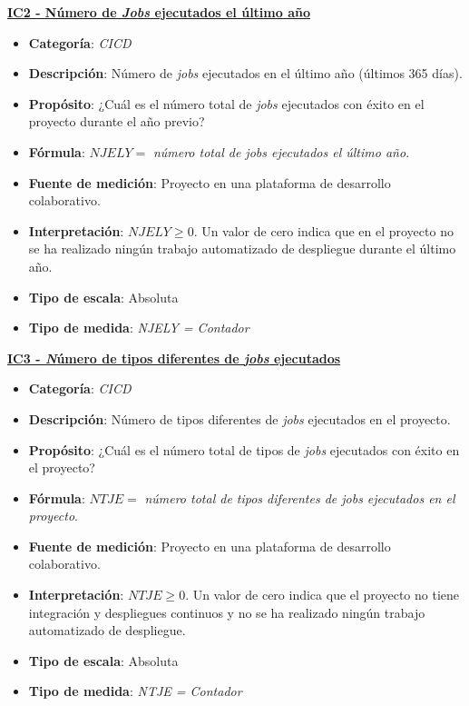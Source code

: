 \textbf{\underline{IC2 - Número de \textit{Jobs} ejecutados el último año}}
\begin{itemize}
	\item \textbf{Categoría}: \textit{CICD}
	\item \textbf{Descripción}: Número de \textit{jobs} ejecutados en el último año (últimos 365 días).
	\item \textbf{Propósito}: ¿Cuál es el número total de \textit{jobs} ejecutados con éxito en el proyecto durante el año previo?
	\item \textbf{Fórmula}: $NJELY =$ \textit{número total de jobs ejecutados el último año}.
	\item \textbf{Fuente de medición}: Proyecto en una plataforma de desarrollo colaborativo.
	\item \textbf{Interpretación}: $NJELY \geq 0$. Un valor de cero indica que en el proyecto no se ha realizado ningún trabajo automatizado de despliegue durante el último año.
	\item \textbf{Tipo de escala}: Absoluta
	\item \textbf{Tipo de medida}: \textit{NJELY = Contador}
\end{itemize}

\textbf{\underline{IC3 - \textit Número de tipos diferentes de \textit{jobs} ejecutados}}
\begin{itemize}
	\item \textbf{Categoría}: \textit{CICD}
	\item \textbf{Descripción}: Número de tipos diferentes de \textit{jobs} ejecutados en el proyecto.
	\item \textbf{Propósito}: ¿Cuál es el número total de tipos de \textit{jobs} ejecutados con éxito en el proyecto?
	\item \textbf{Fórmula}: $NTJE =$ \textit{número total de tipos diferentes de jobs ejecutados en el proyecto}.
	\item \textbf{Fuente de medición}: Proyecto en una plataforma de desarrollo colaborativo.
	\item \textbf{Interpretación}: $NTJE \geq 0$. Un valor de cero indica que el proyecto no tiene integración y despliegues continuos y no se ha realizado ningún trabajo automatizado de despliegue.
	\item \textbf{Tipo de escala}: Absoluta
	\item \textbf{Tipo de medida}: \textit{NTJE = Contador}
\end{itemize}

